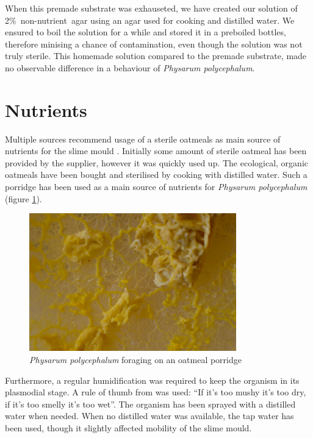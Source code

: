 When this premade substrate was exhauseted, we have created our solution of 2\%~non-nutrient~agar using an agar used for cooking and distilled water. We ensured to boil the solution for a while and stored it in a preboiled bottles, therefore minising a chance of contamination, even though the solution was not truly sterile. This homemade solution compared to the premade substrate, made no observable difference in a behaviour of \textit{Physarum polycephalum}.


\section*{Nutrients}

Multiple sources recommend usage of a sterile oatmeals as main source of nutrients for the slime mould \cite{nakagaki2000intelligence,nakagaki2004obtaining,adamatzky2010physarum}. Initially some amount of sterile oatmeal has been provided by the supplier, however it was quickly used up. The ecological, organic oatmeals have been bought and sterilised by cooking with distilled water. Such a porridge has been used as a main source of nutrients for \textit{Physarum polycephalum} (figure \ref{figure:p_porridge}).

\begin{figure}
  \centering

  \includegraphics[width=0.8\textwidth]{figures/physarum/D8E_2184.jpg}

  \caption{\textit{Physarum polycephalum} foraging on an oatmeal porridge}
  \label{figure:p_porridge}
\end{figure}

Furthermore, a regular humidification was required to keep the organism in its plasmodial stage. A rule of thumb from \cite{adamatzky2010physarum} was used: ``If it's too mushy it's too dry, if it's too smelly it's too wet''. The organism has been sprayed with a distilled water when needed. When no distilled water was available, the tap water has been used, though it slightly affected mobility of the slime mould.
